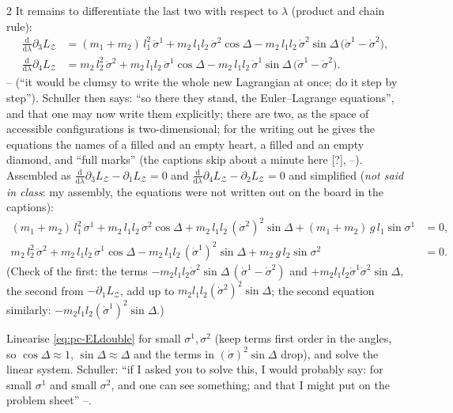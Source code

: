 \begin{paracol}{2}
It remains to differentiate the last two with respect to $\lambda$ (product and chain rule):
\begin{align*}
  \frac{\mathrm d}{\mathrm d\lambda}\partial_3L_{\mathcal Z}&=(m_1+m_2)\,l_1^2\,\ddot\sigma^1+m_2\,l_1l_2\,\ddot\sigma^2\cos\Delta-m_2\,l_1l_2\,\dot\sigma^2\sin\Delta\,\bigl(\dot\sigma^1-\dot\sigma^2\bigr),\\
  \frac{\mathrm d}{\mathrm d\lambda}\partial_4L_{\mathcal Z}&=m_2\,l_2^2\,\ddot\sigma^2+m_2\,l_1l_2\,\ddot\sigma^1\cos\Delta-m_2\,l_1l_2\,\dot\sigma^1\sin\Delta\,\bigl(\dot\sigma^1-\dot\sigma^2\bigr).
\end{align*}
-- (``it would be clumsy to write the whole new Lagrangian at once; do it step by step''). Schuller then says: ``so there they stand, the Euler--Lagrange equations'', and that one may now write them explicitly; there are two, as the space of accessible configurations is two-dimensional; for the writing out he gives the equations the names of a filled and an empty heart, a filled and an empty diamond, and ``full marks'' (the captions skip about a minute here [?], --). Assembled as $\frac{\mathrm d}{\mathrm d\lambda}\partial_3L_{\mathcal Z}-\partial_1L_{\mathcal Z}=0$ and $\frac{\mathrm d}{\mathrm d\lambda}\partial_4L_{\mathcal Z}-\partial_2L_{\mathcal Z}=0$ and simplified (\emph{not said in class}: my assembly, the equations were not written out on the board in the captions):
\begin{equation}\label{eq:pc-ELdouble}
  \begin{aligned}
  (m_1+m_2)\,l_1^2\,\ddot\sigma^1+m_2\,l_1l_2\,\ddot\sigma^2\cos\Delta+m_2\,l_1l_2\,(\dot\sigma^2)^2\sin\Delta+(m_1+m_2)\,g\,l_1\sin\sigma^1&=0,\\
  m_2\,l_2^2\,\ddot\sigma^2+m_2\,l_1l_2\,\ddot\sigma^1\cos\Delta-m_2\,l_1l_2\,(\dot\sigma^1)^2\sin\Delta+m_2\,g\,l_2\sin\sigma^2&=0 .
  \end{aligned}
\end{equation}
(Check of the first: the terms $-m_2l_1l_2\dot\sigma^2\sin\Delta\,(\dot\sigma^1-\dot\sigma^2)$ and $+m_2l_1l_2\dot\sigma^1\dot\sigma^2\sin\Delta$, the second from $-\partial_1L_{\mathcal Z}$, add up to $m_2l_1l_2(\dot\sigma^2)^2\sin\Delta$; the second equation similarly: $-m_2l_1l_2(\dot\sigma^1)^2\sin\Delta$.)

\begin{exercise}\label{ex:pc-small}
Linearise \eqref{eq:pc-ELdouble} for small $\sigma^1,\sigma^2$ (keep terms first order in the angles, so $\cos\Delta\approx1$, $\sin\Delta\approx\Delta$ and the terms in $(\dot\sigma)^2\sin\Delta$ drop), and solve the linear system. Schuller: ``if I asked you to solve this, I would probably say: for small $\sigma^1$ and small $\sigma^2$, and one can see something; and that I might put on the problem sheet'' --.
\end{exercise}


\end{paracol}
